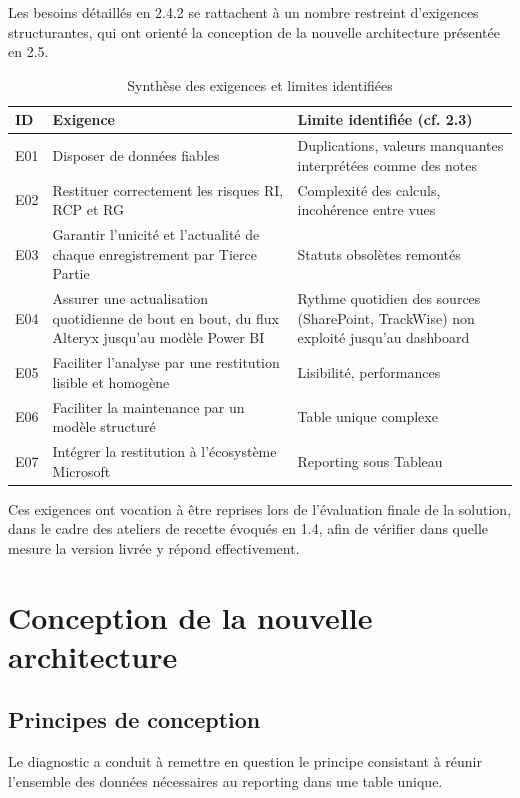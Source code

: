 Les besoins détaillés en 2.4.2 se rattachent à un nombre restreint d'exigences 
structurantes, qui ont orienté la conception de la nouvelle architecture présentée en 2.5. 

\begin{table}[htbp]
\centering
\renewcommand{\arraystretch}{1.5}
\begin{tabularx}{\textwidth}{| l | X | X |}
\hline
\textbf{ID} & \textbf{Exigence} & \textbf{Limite identifiée (cf. 2.3)} \\
\hline
E01 & Disposer de données fiables & Duplications, valeurs manquantes interprétées comme des notes \\
\hline
E02 & Restituer correctement les risques RI, RCP et RG & Complexité des calculs, incohérence entre vues \\
\hline
E03 & Garantir l'unicité et l'actualité de chaque enregistrement par Tierce Partie & Statuts obsolètes remontés \\
\hline
E04 & Assurer une actualisation quotidienne de bout en bout, du flux Alteryx jusqu'au modèle Power BI & Rythme quotidien des sources (SharePoint, TrackWise) non exploité jusqu'au dashboard \\
\hline
E05 & Faciliter l'analyse par une restitution lisible et homogène & Lisibilité, performances \\
\hline
E06 & Faciliter la maintenance par un modèle structuré & Table unique complexe \\
\hline
E07 & Intégrer la restitution à l'écosystème Microsoft & Reporting sous Tableau \\
\hline
\end{tabularx}
\caption{Synthèse des exigences et limites identifiées}
\end{table}

Ces exigences ont vocation à être reprises lors de l'évaluation finale de la solution, 
dans le cadre des ateliers de recette évoqués en 1.4, afin de vérifier dans quelle mesure la 
version livrée y répond effectivement. 

\section{Conception de la nouvelle architecture} 
\subsection{Principes de conception}
Le diagnostic a conduit à remettre en question le principe consistant à réunir l’ensemble 
des données nécessaires au reporting dans une table unique. \\

